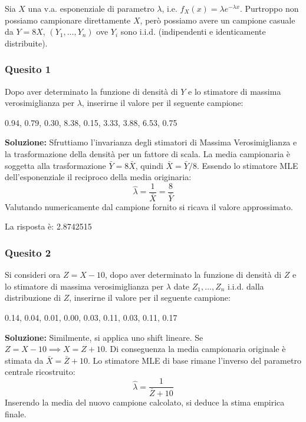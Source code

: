 \documentclass[12pt, a4paper]{article}
\begin{document}
\vspace{0.5cm}
\begin{tcolorbox}[colback=lightergray!10, colframe=tocsec, title=\textbf{Esercizio 15}]
Sia $X$ una v.a. esponenziale di parametro $\lambda$, i.e. $f_X(x) = \lambda e^{-\lambda x}$. Purtroppo non possiamo campionare direttamente $X$, però possiamo avere un campione casuale da $Y=8X$, $(Y_1,\dots,Y_n)$ ove $Y_i$ sono i.i.d. (indipendenti e identicamente distribuite).
\end{tcolorbox}

\subsubsection*{Quesito 1}
Dopo aver determinato la funzione di densità di $Y$ e lo stimatore di massima verosimiglianza per $\lambda$, inserirne il valore per il seguente campione:
\begin{center}
    0.94, 0.79, 0.30, 8.38, 0.15, 3.33, 3.88, 6.53, 0.75
\end{center}
\textbf{Soluzione:}
Sfruttiamo l'invarianza degli stimatori di Massima Verosimiglianza e la trasformazione della densità per un fattore di scala. La media campionaria è soggetta alla trasformazione $\bar{Y} = 8\bar{X}$, quindi $\bar{X} = \bar{Y}/8$. Essendo lo stimatore MLE dell'esponenziale il reciproco della media originaria:
$$ \hat{\lambda} = \frac{1}{\bar{X}} = \frac{8}{\bar{Y}} $$
Valutando numericamente dal campione fornito si ricava il valore approssimato.

La risposta è: 2.8742515

\subsubsection*{Quesito 2}
Si consideri ora $Z=X-10$, dopo aver determinato la funzione di densità di $Z$ e lo stimatore di massima verosimiglianza per $\lambda$ date $Z_1,\dots,Z_n$ i.i.d. dalla distribuzione di $Z$, inserirne il valore per il seguente campione:
\begin{center}
0.14, 0.04, 0.01, 0.00, 0.03, 0.11, 0.03, 0.11, 0.17
\end{center}

\textbf{Soluzione:}
Similmente, si applica uno shift lineare. Se $Z = X-10 \implies X = Z+10$. Di conseguenza la media campionaria originale è stimata da $\bar{X} = \bar{Z} + 10$.
Lo stimatore MLE di base rimane l'inverso del parametro centrale ricostruito:
$$ \hat{\lambda} = \frac{1}{\bar{Z} + 10} $$
Inserendo la media del nuovo campione calcolato, si deduce la stima empirica finale.
\end{document}
